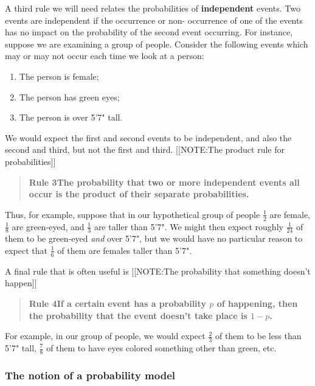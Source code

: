 A third rule we will need relates the probabilities of {\bf
  independent} events.  Two events are independent if the occurrence
or non- occurrence of one of the events has no impact on the
probability of the second event occurring.  For instance, suppose we
are examining a group of people.  Consider the following events which
may or may not occur each time we look at a person:
\begin{enumerate}

\item The person is female;

\item The person has green eyes;

\item The person is over 5'7" tall.
\end{enumerate}
We would expect the first and second events to be independent, and
also the second and third, but not the first and third.
[[NOTE:The product rule  for probabilities]]
\begin{quote}

{\bf Rule 3\quad The probability that two or more independent events
  all occur is the product of their separate
  probabilities.}\label{rule3}
\end{quote}
Thus, for example, suppose that in our hypothetical group of people
$\frac{1}{2}$ are female, $\frac{1}{8}$ are green-eyed, and
$\frac{1}{3}$ are taller than 5'7".  We might then expect roughly
$\frac{1}{24}$ of them to be green-eyed {\em and} over 5'7", but we
would have no particular reason to expect that $\frac{1}{6}$ of them
are females taller than 5'7".

A final rule that is often useful is
[[NOTE:The probability  that something  doesn't happen]]
\begin{quote}

{\bf Rule 4\quad If a certain event has a probability \boldmath $p$ of
  happening, then the probability that the event doesn't take place is
  $1-p$.}\label{rule4}
\end{quote}
For example, in our group of people, we would expect $\frac{2}{3}$ of
them to be less than 5'7" tall, $\frac{7}{8}$ of them to have eyes
colored something other than green, etc.

\subsubsection{The notion of a probability model}
\label{subsubsec:the-notion-of-a-probability-model}

